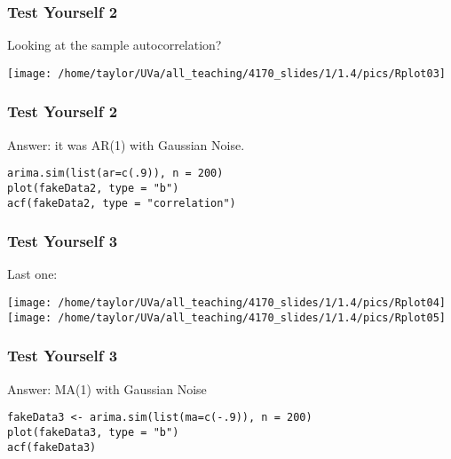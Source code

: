 \documentclass{beamer}
\begin{document}

\begin{frame}
\frametitle{Test Yourself 2}

Looking at the sample autocorrelation?

\begin{center}
\texttt{[image: /home/taylor/UVa/all\_teaching/4170\_slides/1/1.4/pics/Rplot03]}
\end{center}


\end{frame}



\begin{frame}[fragile]
\frametitle{Test Yourself 2}

Answer: it was AR(1) with Gaussian Noise.
\begin{verbatim}
arima.sim(list(ar=c(.9)), n = 200)
plot(fakeData2, type = "b")
acf(fakeData2, type = "correlation")
\end{verbatim}

\end{frame}


\begin{frame}[fragile]
\frametitle{Test Yourself 3}

Last one: 

\begin{center}
\texttt{[image: /home/taylor/UVa/all\_teaching/4170\_slides/1/1.4/pics/Rplot04]}\\
\texttt{[image: /home/taylor/UVa/all\_teaching/4170\_slides/1/1.4/pics/Rplot05]}
\end{center}


\end{frame}


\begin{frame}[fragile]
\frametitle{Test Yourself 3}

Answer: MA(1) with Gaussian Noise
\begin{verbatim}
fakeData3 <- arima.sim(list(ma=c(-.9)), n = 200)
plot(fakeData3, type = "b")
acf(fakeData3)
\end{verbatim}

\end{frame}
\end{document}
